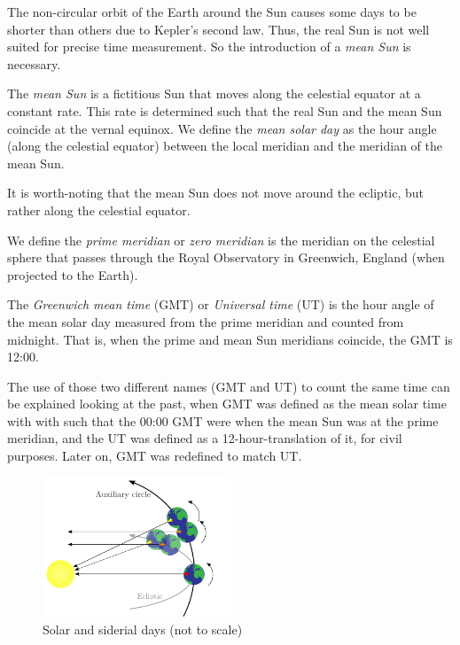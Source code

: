 \documentclass[../main.tex]{subfiles}
\begin{document}
The non-circular orbit of the Earth around the Sun causes some days to be shorter than others due to Kepler's second law. Thus, the real Sun is not well suited for precise time measurement. So the introduction of a \emph{mean Sun} is necessary.

\begin{definition}
  The \emph{mean Sun} is a fictitious Sun that moves along the celestial equator at a constant rate. This rate is determined such that the real Sun and the mean Sun coincide at the vernal equinox. We define the \emph{mean solar day} as the hour angle (along the celestial equator) between the local meridian and the meridian of the mean Sun.
\end{definition}
It is worth-noting that the mean Sun does not move around the ecliptic, but rather along the celestial equator.
\begin{definition}
  We define the \emph{prime meridian} or \emph{zero meridian} is the meridian on the celestial sphere that passes through the Royal Observatory in Greenwich, England (when projected to the Earth).
\end{definition}
\begin{definition}
  The \emph{Greenwich mean time} (GMT) or \emph{Universal time} (UT) is the hour angle of the mean solar day measured from the prime meridian and counted from midnight. That is, when the prime and mean Sun meridians coincide, the GMT is 12:00.

\end{definition}
The use of those two different names (GMT and UT) to count the same time can be explained looking at the past, when GMT was defined as the mean solar time with with such that the 00:00 GMT were when the mean Sun was at the prime meridian, and the UT was defined as a 12-hour-translation of it, for civil purposes. Later on, GMT was redefined to match UT.

\begin{figure}[ht]
  \centering
  \includegraphics[width=0.5\textwidth]{Images/siderial.pdf}
  \caption{Solar and siderial days (not to scale)}
  \label{fig:siderial}
\end{figure}
\end{document}
